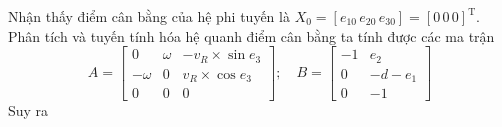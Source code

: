          \hspace{0.6cm}Nhận thấy điểm cân bằng của hệ phi tuyến là $X_0 = [e_{10} \, e_{20} \, e_{30}] = [0 \, 0 \, 0]^{\text{T}}$. Phân tích và tuyến tính hóa hệ quanh điểm cân bằng ta tính được các ma trận
          \begin{equation*}
               A = \begin{bmatrix}
               0 & \omega & -v_R \times \sin e_3 \\
               -\omega & 0 & v_R \times \cos e_3 \\
               0 & 0 & 0
               \end{bmatrix}; \quad B = \begin{bmatrix}
               -1 & e_2 \\
               0 & -d - e_1 \\
               0 & -1
               \end{bmatrix}
          \end{equation*}
          Suy ra 

